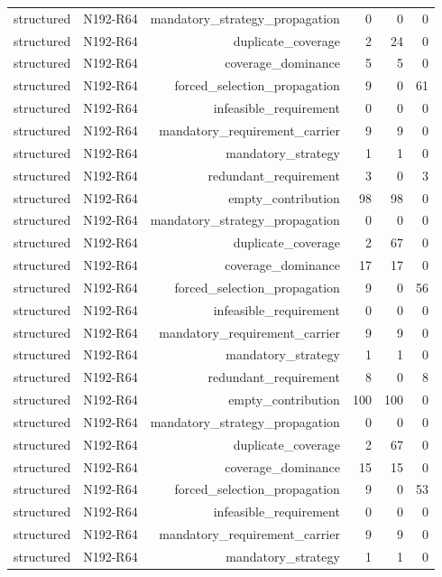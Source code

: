 {\begin{longtable}{lrrrrr}
structured & N192-R64 & mandatory\_strategy\_propagation & 0 & 0 & 0 \\
structured & N192-R64 & duplicate\_coverage & 2 & 24 & 0 \\
structured & N192-R64 & coverage\_dominance & 5 & 5 & 0 \\
structured & N192-R64 & forced\_selection\_propagation & 9 & 0 & 61 \\
structured & N192-R64 & infeasible\_requirement & 0 & 0 & 0 \\
structured & N192-R64 & mandatory\_requirement\_carrier & 9 & 9 & 0 \\
structured & N192-R64 & mandatory\_strategy & 1 & 1 & 0 \\
structured & N192-R64 & redundant\_requirement & 3 & 0 & 3 \\
structured & N192-R64 & empty\_contribution & 98 & 98 & 0 \\
structured & N192-R64 & mandatory\_strategy\_propagation & 0 & 0 & 0 \\
structured & N192-R64 & duplicate\_coverage & 2 & 67 & 0 \\
structured & N192-R64 & coverage\_dominance & 17 & 17 & 0 \\
structured & N192-R64 & forced\_selection\_propagation & 9 & 0 & 56 \\
structured & N192-R64 & infeasible\_requirement & 0 & 0 & 0 \\
structured & N192-R64 & mandatory\_requirement\_carrier & 9 & 9 & 0 \\
structured & N192-R64 & mandatory\_strategy & 1 & 1 & 0 \\
structured & N192-R64 & redundant\_requirement & 8 & 0 & 8 \\
structured & N192-R64 & empty\_contribution & 100 & 100 & 0 \\
structured & N192-R64 & mandatory\_strategy\_propagation & 0 & 0 & 0 \\
structured & N192-R64 & duplicate\_coverage & 2 & 67 & 0 \\
structured & N192-R64 & coverage\_dominance & 15 & 15 & 0 \\
structured & N192-R64 & forced\_selection\_propagation & 9 & 0 & 53 \\
structured & N192-R64 & infeasible\_requirement & 0 & 0 & 0 \\
structured & N192-R64 & mandatory\_requirement\_carrier & 9 & 9 & 0 \\
structured & N192-R64 & mandatory\_strategy & 1 & 1 & 0 \\

\end{longtable}}
